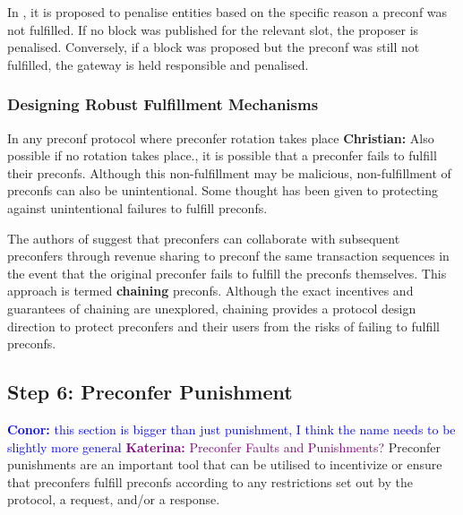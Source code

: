 \documentclass[a4paper]{article}
\theoremstyle{boldstyle}
\newcommand{\cm}[1]{\textcolor{blue}{\textbf{Conor:} #1}}
\newcommand{\dk}[1]{\textcolor{cyan}{\textbf{Demetris:} #1}}
\newcommand{\ks}[1]{\textcolor{purple}{\textbf{Katerina:} #1}}
\newcommand{\chm}[1]{\textcolor{OliveGreen}{\textbf{Christian:} #1}}
\begin{document}
In \cite{gateway_trust_liveness}, it is proposed to penalise entities based on the specific reason a preconf was not fulfilled. If no block was published for the relevant slot, the proposer is penalised. Conversely, if a block was proposed but the preconf was still not fulfilled, the gateway is held responsible and penalised.


\subsubsection{Designing Robust Fulfillment Mechanisms}\label{robust_delivery}

    In any preconf protocol where preconfer rotation takes place \chm{Also possible if no rotation takes place.}, it is possible that a preconfer fails to fulfill their preconfs. Although this non-fulfillment may be malicious, non-fulfillment of preconfs can also be unintentional. Some thought has been given to protecting against unintentional failures to fulfill preconfs.
    
     The authors of \cite{W:AvoidingAccidentalLivenessFaultsforBasedPreconfs} suggest that preconfers can collaborate with subsequent preconfers through revenue sharing to preconf the same transaction sequences in the event that the original preconfer fails to fulfill the preconfs themselves. This approach is termed \textbf{chaining} preconfs. Although the exact incentives and guarantees of chaining are unexplored, chaining provides a protocol design direction to protect preconfers and their users from the risks of failing to fulfill preconfs. 
     
    
\subsection{Step 6: Preconfer Punishment} \label{preconfer_punishment}    
    \cm{this section is bigger than just punishment, I think the name needs to be slightly more general} \ks{Preconfer Faults and Punishments?}
    Preconfer punishments are an important tool that can be utilised to incentivize or ensure that preconfers fulfill preconfs according to any restrictions set out by the protocol, a request, and/or a response.
    
\end{document}
